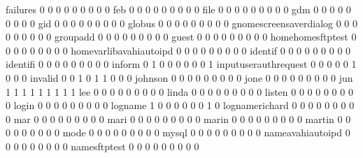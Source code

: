 \documentclass[compress,8pt]{beamer}
\begin{document}
\begin{frame}
\begin{Schunk}
  failures                                   0   0   0   0   0   0   0   0   0
  feb                                        0   0   0   0   0   0   0   0   0
  file                                       0   0   0   0   0   0   0   0   0
  gdm                                        0   0   0   0   0   0   0   0   0
  gid                                        0   0   0   0   0   0   0   0   0
  globus                                     0   0   0   0   0   0   0   0   0
  gnomescreensaverdialog                     0   0   0   0   0   0   0   0   0
  groupadd                                   0   0   0   0   0   0   0   0   0
  guest                                      0   0   0   0   0   0   0   0   0
  homehomesftptest                           0   0   0   0   0   0   0   0   0
  homevarlibavahiautoipd                     0   0   0   0   0   0   0   0   0
  identif                                    0   0   0   0   0   0   0   0   0
  identifi                                   0   0   0   0   0   0   0   0   0
  inform                                     0   1   0   0   0   0   0   0   1
  inputuserauthrequest                       0   0   0   0   0   1   0   0   0
  invalid                                    0   0   1   0   1   1   0   0   0
  johnson                                    0   0   0   0   0   0   0   0   0
  jone                                       0   0   0   0   0   0   0   0   0
  jun                                        1   1   1   1   1   1   1   1   1
  lee                                        0   0   0   0   0   0   0   0   0
  linda                                      0   0   0   0   0   0   0   0   0
  listen                                     0   0   0   0   0   0   0   0   0
  login                                      0   0   0   0   0   0   0   0   0
  logname                                    1   0   0   0   0   0   0   1   0
  lognamerichard                             0   0   0   0   0   0   0   0   0
  mar                                        0   0   0   0   0   0   0   0   0
  mari                                       0   0   0   0   0   0   0   0   0
  marin                                      0   0   0   0   0   0   0   0   0
  martin                                     0   0   0   0   0   0   0   0   0
  mode                                       0   0   0   0   0   0   0   0   0
  mysql                                      0   0   0   0   0   0   0   0   0
  nameavahiautoipd                           0   0   0   0   0   0   0   0   0
  namesftptest                               0   0   0   0   0   0   0   0   0

\end{Schunk}
\end{frame}
\end{document}
